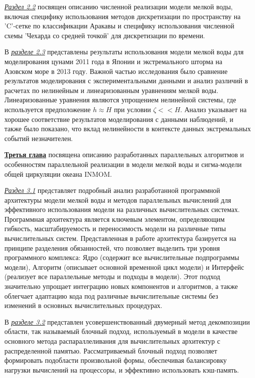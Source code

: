 \underline{\textit{Раздел 2.2}} посвящен описанию численной реализации модели мелкой воды, включая специфику использования методов дискретизации по пространству на 'C'-сетке по классификации Аракавы и специфику использования численной схемы 'Чехарда со средней точкой' для дискретизации по времени.

В \underline{\textit{разделе 2.3}} представлены результаты использования модели мелкой воды для моделирования цунами 2011 года в Японии и экстремального шторма на Азовском море в 2013 году. Важной частью исследования было сравнение результатов моделирования с экспериментальными данными и анализ различий в расчетах по нелинейным и линеаризованным уравнениям мелкой воды. Линеаризованные уравнения являются упрощением нелинейной системы, где используется предположение $h \approx H$ при условии $\zeta << H$.
Анализ указывает на хорошее соответствие результатов моделирования с данными наблюдений, и также было показано, что вклад нелинейности в контексте данных экстремальных событий незначителен.

\underline{\textbf{Третья глава}} посвящена описанию разработанных параллельных алгоритмов и особенностям параллельной реализации в модели мелкой воды и сигма-модели общей циркуляции океана INMOM.

\underline{\textit{Раздел 3.1}} представляет подробный анализ разработанной программной архитектуры модели мелкой воды и методов параллельных вычислений для эффективного использования модели на различных вычислительных системах.
Программная архитектура является ключевым элементом, определяющим гибкость, масштабируемость и переносимость модели на различные типы вычислительных систем. Представленная в работе архитектура базируется на принципе разделения обязанностей, что позволяет выделить три уровня программного комплекса: Ядро (содержит все вычислительные подпрограммы модели), Алгоритм (описывает основной временной цикл модели) и Интерфейс (реализует все параллельные методы и подходы в модели).
Этот подход значительно упрощает интеграцию новых компонентов и алгоритмов, а также облегчает адаптацию кода под различные вычислительные системы без изменений в основных вычислительных процедурах.

В \underline{\textit{разделе 3.2}} представлен усовершенствованный двумерный метод декомпозиции области, так называемый блочный подход, используемый в модели в качестве основного метода распараллеливания для вычислительных архитектур с распределенной памятью.
Рассматриваемый блочный подход позволяет формировать подобласти произвольной формы, обеспечивая балансировку нагрузки вычислений на процессоры, и эффективно использовать кэш-память.

